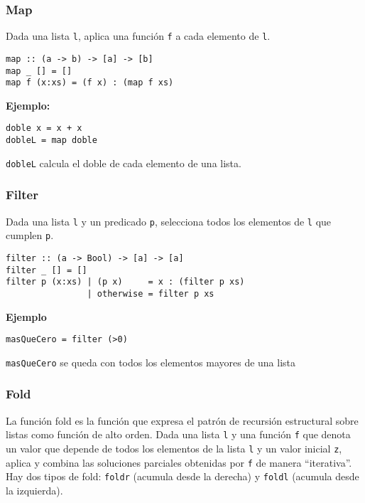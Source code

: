 \subsubsection{Map}
Dada una lista \texttt{l}, aplica una función \texttt{f} a cada elemento de \texttt{l}.
\begin{centrado}
	\begin{verbatim}
map :: (a -> b) -> [a] -> [b]
map _ [] = []
map f (x:xs) = (f x) : (map f xs)
	\end{verbatim}
\end{centrado} 

\textbf{Ejemplo:}
\begin{centrado}
	\begin{verbatim}
doble x = x + x
dobleL = map doble  
	\end{verbatim}
\end{centrado} 

\texttt{dobleL} calcula el doble de cada elemento de una lista.

\subsubsection{Filter}
Dada una lista \texttt{l} y un predicado \texttt{p}, selecciona todos los elementos de \texttt{l} que cumplen \texttt{p}.

\begin{centrado}
	\begin{verbatim}
filter :: (a -> Bool) -> [a] -> [a]
filter _ [] = []
filter p (x:xs) | (p x)     = x : (filter p xs)
                | otherwise = filter p xs  
	\end{verbatim}
\end{centrado}

\textbf{Ejemplo}
\begin{centrado}
	\begin{verbatim}
masQueCero = filter (>0)
	\end{verbatim}
\end{centrado}

\texttt{masQueCero} se queda con todos los elementos mayores de una lista

\subsubsection{Fold}
La función {fold} es la función que expresa el patrón de recursión estructural sobre listas como función de alto orden. Dada una lista \texttt{l} y una función \texttt{f} que denota un valor que depende de todos los elementos de la lista \texttt{l} y un valor inicial \texttt{z}, aplica y combina las soluciones parciales obtenidas por \texttt{f} de manera  ``iterativa''. 
Hay dos tipos de fold: \texttt{foldr} (acumula desde la derecha) y \texttt{foldl} (acumula desde la izquierda).

